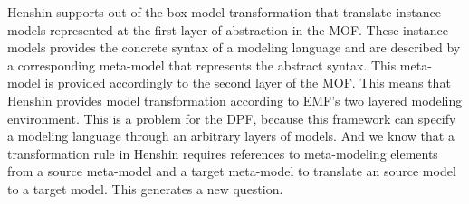 Henshin supports out of the box model transformation that translate
instance models represented at the first layer of abstraction in the MOF. These
instance models provides the concrete syntax of a modeling language and are
described by a corresponding meta-model that represents the abstract syntax.
This meta-model is provided accordingly to the second layer of the MOF. This
means that Henshin provides model transformation according to EMF's two layered
modeling environment. This is a problem for the DPF, because this framework can
specify a modeling language through an arbitrary layers of models. And we know
that a transformation rule in Henshin requires references to meta-modeling
elements from a source meta-model and a target meta-model to translate an
source model to a target model. This generates a new question.

